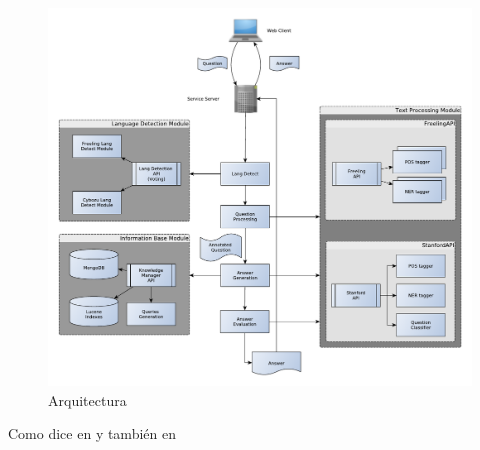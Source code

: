 \begin{figure}
  \centering
    \includegraphics[scale=0.86]{graficos/Architecture}
  \caption{Arquitectura}
  \label{fig:Architecture}
\end{figure}

Como dice en \cite{greenwade93} y también en \cite{RE1}
%
